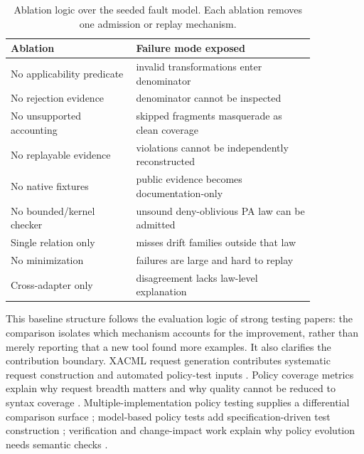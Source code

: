 \documentclass[10pt,conference]{IEEEtran}
\begin{document}
\begin{table}[t]
\centering
\caption{Ablation logic over the seeded fault model.  Each ablation removes one admission or replay mechanism.}
\label{tab:ablations}
\begin{tabular}{p{0.35\linewidth}p{0.50\linewidth}}
\toprule
Ablation & Failure mode exposed \\
\midrule
No applicability predicate & invalid transformations enter denominator \\
No rejection evidence & denominator cannot be inspected \\
No unsupported accounting & skipped fragments masquerade as clean coverage \\
No replayable evidence & violations cannot be independently reconstructed \\
No native fixtures & public evidence becomes documentation-only \\
No bounded/kernel checker & unsound deny-oblivious PA law can be admitted \\
Single relation only & misses drift families outside that law \\
No minimization & failures are large and hard to replay \\
Cross-adapter only & disagreement lacks law-level explanation \\
\bottomrule
\end{tabular}
\end{table}

This baseline structure follows the evaluation logic of strong testing papers: the comparison isolates which mechanism accounts for the improvement, rather than merely reporting that a new tool found more examples.  It also clarifies the contribution boundary.  XACML request generation contributes systematic request construction \cite{bertolino2010systematic} and automated policy-test inputs \cite{bertolino2012xacmlrequests}.  Policy coverage metrics explain why request breadth matters \cite{martin2006coverage} and why quality cannot be reduced to syntax coverage \cite{martin2008quality}.  Multiple-implementation policy testing supplies a differential comparison surface \cite{li2008xacmlmultiple}; model-based policy tests add specification-driven test construction \cite{pretschner2008model}; verification and change-impact work explain why policy evolution needs semantic checks \cite{fisler2005verification} \cite{martin2007changeimpact}.
\end{document}
